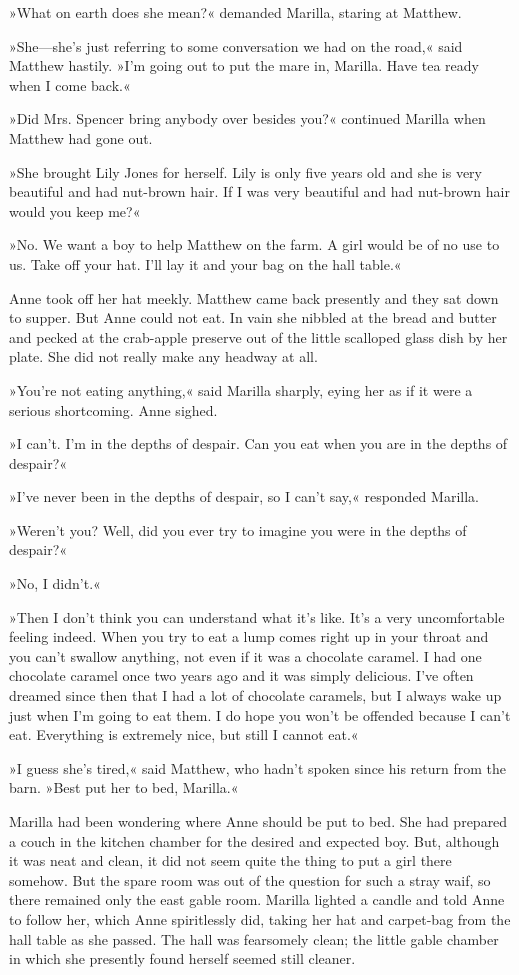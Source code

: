 »What on earth does she mean?« demanded Marilla, staring at Matthew.

»She—she's just referring to some conversation we had on the road,« said Matthew hastily. »I'm going out to put the mare in, Marilla. Have tea ready when I come back.«

»Did Mrs. Spencer bring anybody over besides you?« continued Marilla when Matthew had gone out.

»She brought Lily Jones for herself. Lily is only five years old and she is very beautiful and had nut-brown hair. If I was very beautiful and had nut-brown hair would you keep me?«

»No. We want a boy to help Matthew on the farm. A girl would be of no use to us. Take off your hat. I'll lay it and your bag on the hall table.«

Anne took off her hat meekly. Matthew came back presently and they sat down to supper. But Anne could not eat. In vain she nibbled at the bread and butter and pecked at the crab-apple preserve out of the little scalloped glass dish by her plate. She did not really make any headway at all.

»You're not eating anything,« said Marilla sharply, eying her as if it were a serious shortcoming. Anne sighed.

»I can't. I'm in the depths of despair. Can you eat when you are in the depths of despair?«

»I've never been in the depths of despair, so I can't say,« responded Marilla.

»Weren't you? Well, did you ever try to imagine you were in the depths of despair?«

»No, I didn't.«

»Then I don't think you can understand what it's like. It's a very uncomfortable feeling indeed. When you try to eat a lump comes right up in your throat and you can't swallow anything, not even if it was a chocolate caramel. I had one chocolate caramel once two years ago and it was simply delicious. I've often dreamed since then that I had a lot of chocolate caramels, but I always wake up just when I'm going to eat them. I do hope you won't be offended because I can't eat. Everything is extremely nice, but still I cannot eat.«

»I guess she's tired,« said Matthew, who hadn't spoken since his return from the barn. »Best put her to bed, Marilla.«

Marilla had been wondering where Anne should be put to bed. She had prepared a couch in the kitchen chamber for the desired and expected boy. But, although it was neat and clean, it did not seem quite the thing to put a girl there somehow. But the spare room was out of the question for such a stray waif, so there remained only the east gable room. Marilla lighted a candle and told Anne to follow her, which Anne spiritlessly did, taking her hat and carpet-bag from the hall table as she passed. The hall was fearsomely clean; the little gable chamber in which she presently found herself seemed still cleaner.

